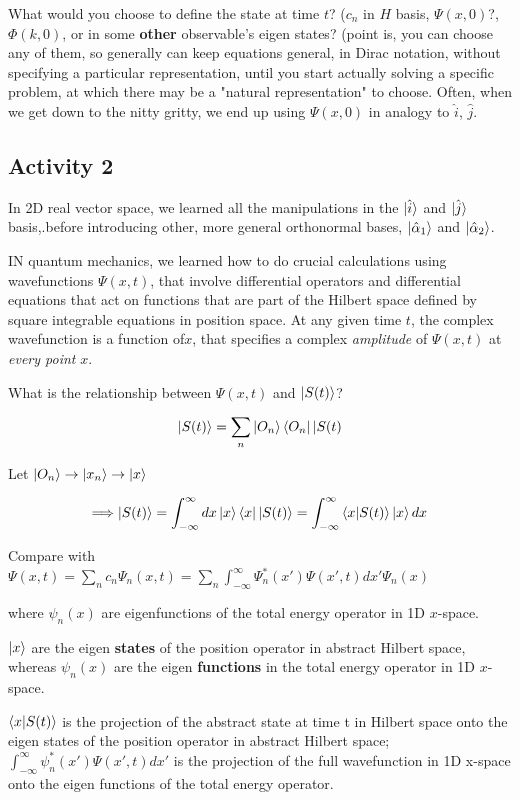 \documentclass{article}
\begin{document}
What would you choose to define the state at time $t$? ($c_n$ in $H$ basis, $\Psi(x,0)$?, $\Phi(k,0)$, or in some \textbf{other} observable's eigen states? (point is, you can choose any of them, so generally can keep equations general, in Dirac notation, without specifying a particular representation, until you start actually solving a specific problem, at which there may be a "natural representation" to choose. Often, when we get down to the nitty gritty, we end up using $\Psi(x,0)$ in analogy to $\hat{i}$, $\hat{j}$. 

\subsection{Activity 2}


In 2D real vector space, we learned all the manipulations in the $\ket{\hat{i}}$ and $\ket{\hat{j}}$ basis,.before introducing other, more general orthonormal bases, $\ket{\hat{\alpha}_1}$ and $\ket{\hat{\alpha}_2}$. 

IN quantum mechanics, we learned how to do crucial calculations using wavefunctions $\Psi(x,t)$, that involve differential operators and differential equations that act on functions that are part of the Hilbert space defined by square integrable equations in position space. At any given time $t$, the complex wavefunction is a function of$x$,  that specifies a complex \textit{amplitude} of $\Psi(x,t)$ at \textit{every point} $x$. 

\hfill

What is the relationship between $\Psi(x,t)$ and $\ket{S(t)}$?

$$\ket{S(t)} = \sum_n \ket{O_n} \bra{O_n} | S(t)$$

Let $\ket{O_n} \rightarrow \ket{x_n} \rightarrow \ket{x}$

$$\Longrightarrow \ket{S(t)} = \int_{- \infty}^\infty dx \ket{x} \bra{x} \ket{S(t)} = \int_{- \infty}^\infty \braket{x|S(t)} \ket{x} dx$$

Compare with $\Psi(x,t) = \sum_n c_n \Psi_n(x,t) = \sum_n \int_{- \infty}^\infty \Psi_n^*(x') \Psi(x',t) dx' \Psi_n(x)$

where $\psi_n(x)$ are eigenfunctions of the total energy operator in 1D $x$-space.

$\ket{x}$ are the eigen \textbf{states} of the position operator in abstract Hilbert space, whereas $\psi_n(x)$ are the eigen \textbf{functions} in the total energy operator in 1D $x$-space. 

$\braket{x|S(t)}$ is the projection of the abstract state at time t in Hilbert space onto the eigen states of the position operator in abstract Hilbert space; $\int_{- \infty}^\infty \psi_n^*(x') \Psi(x',t) dx'$ is the projection of the full wavefunction in 1D x-space onto the eigen functions of the total energy operator. 
\end{document}
